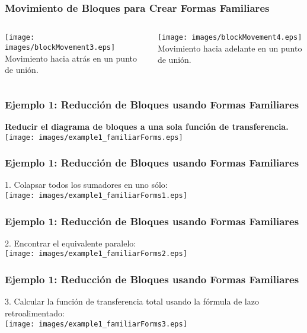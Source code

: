 \documentclass[aspectratio=169,handout]{beamer}
\theoremstyle{definition}
\theoremstyle{plain}
\theoremstyle{remark}
\begin{document}
\begin{frame}[<+->]\frametitle{Movimiento de Bloques para Crear Formas Familiares}
	\begin{columns}
		\begin{column}{0.5\textwidth}
			\centering
			\texttt{[image: images/blockMovement3.eps]}
			\small Movimiento hacia atrás en un punto de unión.
		\end{column}	
		\pause
		\begin{column}{0.5\textwidth}
			\centering
			\texttt{[image: images/blockMovement4.eps]}
			\small Movimiento hacia adelante en un punto de unión.
		\end{column}	
	\end{columns}
\end{frame}

\begin{frame}[<+->]\frametitle{Ejemplo 1: Reducción de Bloques usando Formas Familiares}
\textbf{Reducir el diagrama de bloques a una sola función de transferencia.}\\
\centering
\vspace*{5mm}
\texttt{[image: images/example1\_familiarForms.eps]}	
\end{frame}

\begin{frame}[<+->]\frametitle{Ejemplo 1: Reducción de Bloques usando Formas Familiares}
1. Colapsar todos los sumadores en uno sólo:\\
\centering
\vspace*{5mm}
\texttt{[image: images/example1\_familiarForms1.eps]}	
\end{frame}

\begin{frame}[<+->]\frametitle{Ejemplo 1: Reducción de Bloques usando Formas Familiares}
2. Encontrar el equivalente paralelo:\\
\centering
\vspace*{5mm}
\texttt{[image: images/example1\_familiarForms2.eps]}	
\end{frame}

\begin{frame}[<+->]\frametitle{Ejemplo 1: Reducción de Bloques usando Formas Familiares}
3. Calcular la función de transferencia total usando la fórmula de lazo retroalimentado:\\
\centering
\vspace*{5mm}
\texttt{[image: images/example1\_familiarForms3.eps]}	
\end{frame}
\end{document}
